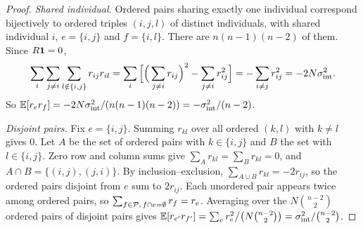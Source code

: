 
\begin{proof}
\emph{Shared individual.} Ordered pairs sharing exactly one individual correspond
bijectively to ordered triples $(i,j,l)$ of distinct individuals, with shared individual
$i$, $e=\{i,j\}$ and $f=\{i,l\}$. There are $n(n-1)(n-2)$ of them. Since $R\mathbf{1}=0$,
\[
\sum_{i}\sum_{j\ne i}\sum_{l\notin\{i,j\}}r_{ij}r_{il}
=\sum_i\Big[\Big(\sum_{j\ne i}r_{ij}\Big)^2-\sum_{j\ne i}r_{ij}^2\Big]
=-\sum_{i\ne j}r_{ij}^2=-2N\sigma^2_{\mathrm{int}} .
\]
So $\mathbb{E}[r_er_f]=-2N\sigma^2_{\mathrm{int}}/(n(n-1)(n-2))=-\sigma^2_{\mathrm{int}}/(n-2)$.

\emph{Disjoint pairs.} Fix $e=\{i,j\}$. Summing $r_{kl}$ over all ordered $(k,l)$
with $k\ne l$ gives $0$. Let $A$ be the set of ordered pairs with
$k\in\{i,j\}$ and $B$ the set with $l\in\{i,j\}$. Zero row and column sums give
$\sum_A r_{kl}=\sum_B r_{kl}=0$, and $A\cap B=\{(i,j),(j,i)\}$. By
inclusion--exclusion, $\sum_{A\cup B}r_{kl}=-2r_{ij}$, so the ordered pairs
disjoint from $e$ sum to $2r_{ij}$. Each unordered pair appears twice among
ordered pairs, so $\sum_{f\in\mathcal{P},\,f\cap e=\emptyset}r_f=r_e$. Averaging over
the $N\binom{n-2}{2}$ ordered pairs of disjoint pairs gives
$\mathbb{E}[r_{e'}r_{f'}]=\sum_{e}r_e^2\big/\big(N\binom{n-2}{2}\big)=\sigma^2_{\mathrm{int}}/\binom{n-2}{2}$.
\end{proof}

